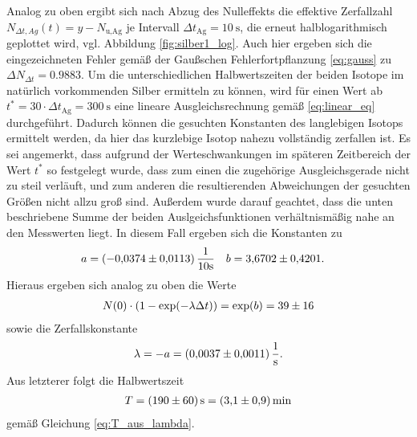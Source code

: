 \noindent
Analog zu oben ergibt sich nach Abzug des Nulleffekts die effektive Zerfallzahl 
$N_{\Delta t,Ag}(t) = y- N_\text{u,Ag}$ je Intervall $\Delta t_\text{Ag} = \qty[]{10}{\second}$,
die erneut halblogarithmisch geplottet wird, vgl. Abbildung \ref{fig:silber1_log}.
Auch hier ergeben sich die eingezeichneten Fehler gemäß der Gaußschen Fehlerfortpflanzung \eqref{eq:gauss} zu $\Delta N_{\Delta t} = \num{0.9883}$.
Um die unterschiedlichen Halbwertszeiten der beiden Isotope im natürlich vorkommenden Silber ermitteln zu können, wird für einen Wert ab 
$t^* = 30 \cdot \Delta t_\text{Ag} = \qty[]{300}{\second}$ eine lineare Ausgleichsrechnung gemäß \eqref{eq:linear_eq} durchgeführt.
Dadurch können die gesuchten Konstanten des langlebigen Isotops ermittelt werden, da hier das kurzlebige Isotop nahezu vollständig zerfallen ist.
Es sei angemerkt, dass aufgrund der Werteschwankungen im späteren Zeitbereich der Wert $t^*$ so festgelegt wurde, 
dass zum einen die zugehörige Ausgleichsgerade nicht zu steil verläuft,
und zum anderen die resultierenden Abweichungen der gesuchten Größen nicht allzu groß sind.
Außerdem wurde darauf geachtet, dass die unten beschriebene Summe der beiden Auslgeichsfunktionen verhältnismäßig nahe an den Messwerten liegt.
In diesem Fall ergeben sich die Konstanten zu 
\begin{align}
    a &= (\num{-0.0374 +- 0.0113}) \, \frac{1}{10 \unit{\second}}  & b &= \num{3.6702 +- 0.4201}.
\end{align}
Hieraus ergeben sich analog zu oben die Werte 
\begin{align}
    N(0) \cdot \left(1- \exp(- \lambda \Delta t)\right) = \exp(b) = \num[]{39 +- 16}
\end{align}
sowie die Zerfallskonstante 
\begin{align}
    \lambda = - a = \qty[]{0.0037 +- 0.0011}{\per\second}.
\end{align}
Aus letzterer folgt die Halbwertszeit 
\begin{align}
    T = \qty[]{190 +- 60}{\second} = \qty[]{3.1 +- 0.9}{\minute}
\end{align}
gemäß Gleichung \eqref{eq:T_aus_lambda}.





